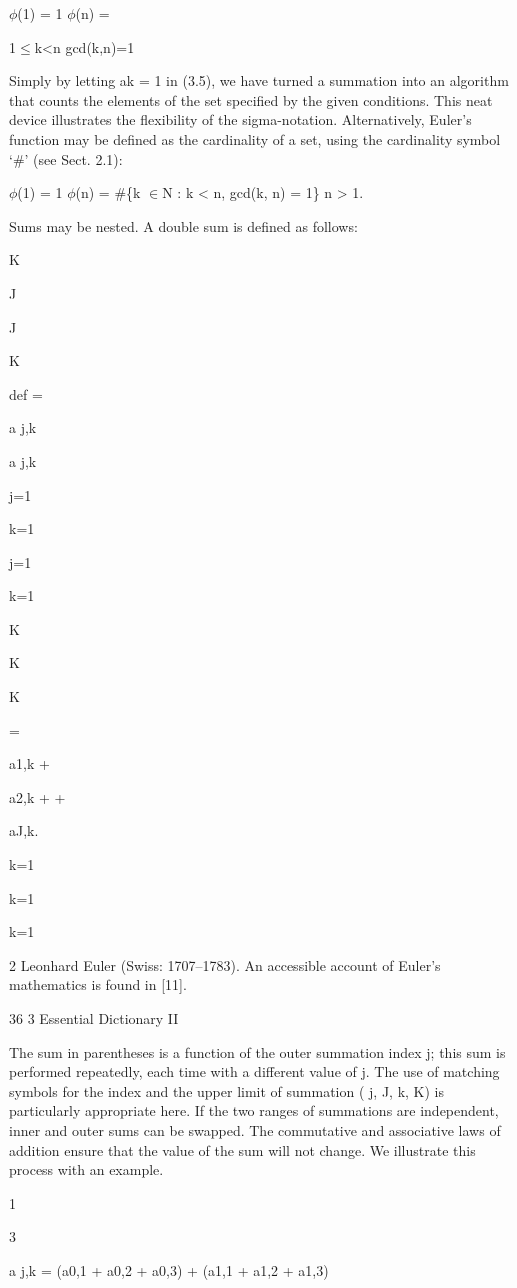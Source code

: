 \documentclass[11pt]{article}
\theoremstyle{plain}
\theoremstyle{definition}
\begin{document}
$\phi$(1) = 1 $\phi$(n) =

1$\leq$k<n gcd(k,n)=1

Simply by letting ak = 1 in (3.5), we have turned a summation into an algorithm that counts the elements of the set specified by the given conditions. This neat device illustrates the flexibility of the sigma-notation. Alternatively, Euler's function may be defined as the cardinality of a set, using the cardinality symbol `\#' (see Sect. 2.1):

$\phi$(1) = 1 $\phi$(n) = \#\{k $\in$N : k < n, gcd(k, n) = 1\} n > 1.

Sums may be nested. A double sum is defined as follows:

K

J

J

K

def =

a j,k

a j,k

j=1

k=1

j=1

k=1

K

K

K

=

a1,k +

a2,k + \textperiodcentered{} \textperiodcentered{} \textperiodcentered{} +

aJ,k.

k=1

k=1

k=1

2 Leonhard Euler (Swiss: 1707--1783). An accessible account of Euler's mathematics is found in [11].

36 3 Essential Dictionary II

The sum in parentheses is a function of the outer summation index j; this sum is performed repeatedly, each time with a different value of j. The use of matching symbols for the index and the upper limit of summation ( j, J, k, K) is particularly appropriate here. If the two ranges of summations are independent, inner and outer sums can be swapped. The commutative and associative laws of addition ensure that the value of the sum will not change. We illustrate this process with an example.

1

3

a j,k = (a0,1 + a0,2 + a0,3) + (a1,1 + a1,2 + a1,3)
\end{document}
